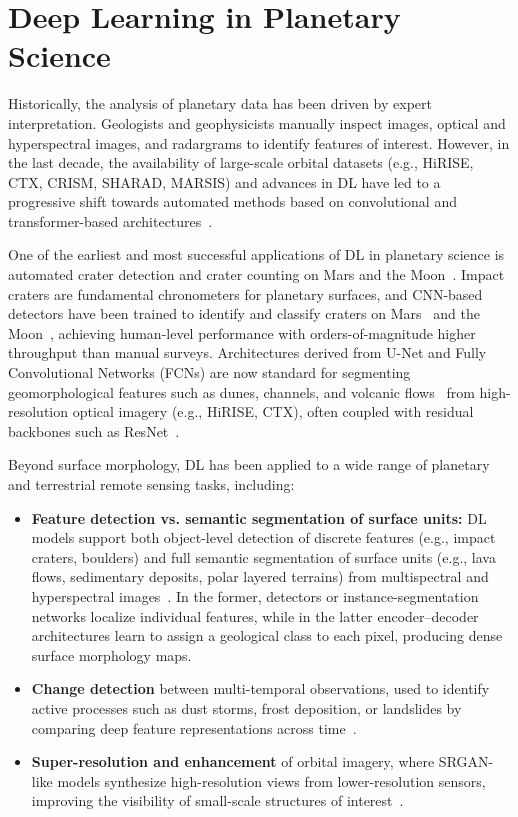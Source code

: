 \section{Deep Learning in Planetary Science}
\label{sec:ml_planetary}
Historically, the analysis of planetary data has been driven by expert interpretation.
Geologists and geophysicists manually inspect images, optical and hyperspectral images, and radargrams to identify features of interest.
However, in the last decade, the availability of large-scale orbital datasets (e.g., HiRISE, CTX, CRISM, SHARAD, MARSIS) and advances in DL have led to a progressive shift towards automated methods based on convolutional and transformer-based architectures~\cite{Ronneberger_2015,He_2016}.

One of the earliest and most successful applications of DL in planetary science is automated crater detection and crater counting on Mars and the Moon~\cite{Silburt2019,LunarCraterDLReview}.
Impact craters are fundamental chronometers for planetary surfaces, and CNN-based detectors have been trained to identify and classify craters on Mars~\cite{Silburt2019,DeepMarsGithub} and the Moon~\cite{LunarCraterDL,LunarCraterDLReview}, achieving human-level performance with orders-of-magnitude higher throughput than manual surveys.
Architectures derived from U-Net and Fully Convolutional Networks (FCNs) are now standard for segmenting geomorphological features such as dunes, channels, and volcanic flows~\cite{Fernandez2019DuneMapping,DeepDuneMapping} from high-resolution optical imagery (e.g., HiRISE, CTX), often coupled with residual backbones such as ResNet~\cite{He_2016}.

Beyond surface morphology, DL has been applied to a wide range of planetary and terrestrial remote sensing tasks, including:
\begin{itemize}
    \item \textbf{Feature detection vs. semantic segmentation of surface units:} DL models support both object-level detection of discrete features (e.g., impact craters, boulders) and full semantic segmentation of surface units (e.g., lava flows, sedimentary deposits, polar layered terrains) from multispectral and hyperspectral images~\cite{Silburt2019,Fernandez2019DuneMapping,Wang2019DeepMars}. In the former, detectors or instance-segmentation networks localize individual features, while in the latter encoder–decoder architectures learn to assign a geological class to each pixel, producing dense surface morphology maps.
    \item \textbf{Change detection} between multi-temporal observations, used to identify active processes such as dust storms, frost deposition, or landslides by comparing deep feature representations across time~\cite{Parajuli2020DustDL,FrontiersSandstorm_2022}.
    \item \textbf{Super-resolution and enhancement} of orbital imagery, where SRGAN-like models synthesize high-resolution views from lower-resolution sensors, improving the visibility of small-scale structures of interest~\cite{Ledig2017SRGAN,Li2022SRGANRemoteSensing}. 
\end{itemize}

